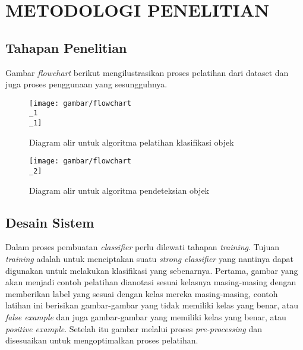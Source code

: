 
\chapter{METODOLOGI PENELITIAN}

\section{Tahapan Penelitian}

Gambar \textit{flowchart} berikut mengilustrasikan proses pelatihan 
 dari dataset dan juga proses penggunaan yang sesungguhnya.

\begin{figure}[H]
  \centering{}
	\texttt{[image: gambar/flowchart\\\_1\\\_1]}
  \caption{Diagram alir untuk algoritma pelatihan klasifikasi objek}
\end{figure}

\begin{figure}[H]
  \centering{}
	\texttt{[image: gambar/flowchart\\\_2]}
  \caption{Diagram alir untuk algoritma pendeteksian objek}
\end{figure}


\section{Desain Sistem}

Dalam proses pembuatan \emph{classifier} perlu dilewati tahapan \textit{training}. 
Tujuan \textit{training} adalah untuk menciptakan suatu \emph{strong classifier} 
yang nantinya dapat digunakan untuk melakukan klasifikasi yang sebenarnya.
Pertama, gambar yang akan menjadi contoh pelatihan dianotasi sesuai kelasnya masing-masing dengan 
memberikan label yang sesuai dengan kelas mereka masing-masing, 
contoh latihan ini berisikan gambar-gambar yang tidak memiliki kelas yang benar, atau 
\emph{false example} dan juga gambar-gambar yang memiliki kelas yang benar, atau 
\emph{positive example}. Setelah itu gambar melalui proses \emph{pre-processing} dan disesuaikan 
untuk mengoptimalkan proses pelatihan.

